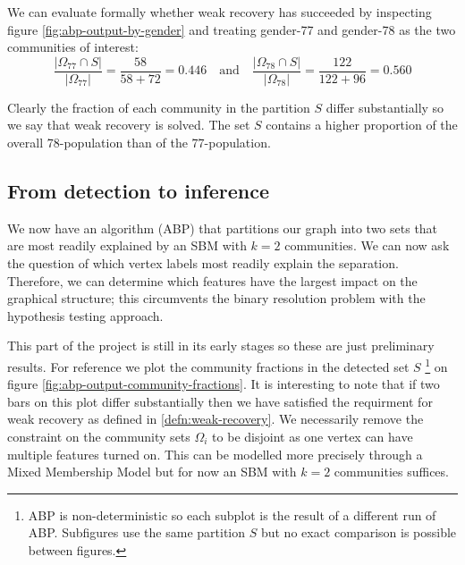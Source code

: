 \documentclass[]{article}
\begin{document}
We can evaluate formally whether weak recovery has succeeded by inspecting figure \ref{fig:abp-output-by-gender} and treating gender-77 and gender-78 as the two communities of interest:
%
\begin{equation}
	\frac{|\Omega_{77} \cap S|}{|\Omega_{77}|} = \frac{58}{58+72} = 0.446
	\quad \textrm{and} \quad
	 \frac{|\Omega_{78} \cap S|}{|\Omega_{78}|} = \frac{122}{122+96} = 0.560
\end{equation}

Clearly the fraction of each community in the partition $S$ differ substantially so we say that weak recovery is solved. The set $S$ contains a higher proportion of the overall 78-population than of the 77-population.

\subsection{From detection to inference}

We now have an algorithm (ABP) that partitions our graph into two sets that are most readily explained by an SBM with $k=2$ communities. We can now ask the question of which vertex labels most readily explain the separation. Therefore, we can determine which features have the largest impact on the graphical structure; this circumvents the binary resolution problem with the hypothesis testing approach.

This part of the project is still in its early stages so these are just preliminary results. For reference we plot the community fractions in the detected set $S$
\footnote{ABP is non-deterministic so each subplot is the result of a different run of ABP. Subfigures use the same partition $S$ but no exact comparison is possible between figures.}
on figure \ref{fig:abp-output-community-fractions}. It is interesting to note that if two bars on this plot differ substantially then we have satisfied the requirment for weak recovery as defined in \ref{defn:weak-recovery}. We necessarily remove the constraint on the community sets $\Omega_i$ to be disjoint as one vertex can have multiple features turned on. This can be modelled more precisely through a Mixed Membership Model but for now an SBM with $k=2$ communities suffices.
\end{document}
